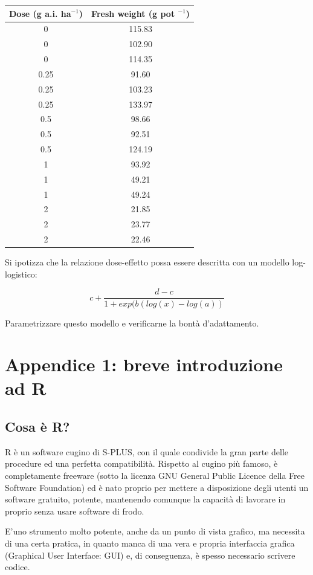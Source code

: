 \documentclass[a4paper,12pt,oneside]{book}
\begin{document}
\begin{longtable}[]{@{}cc@{}}
\toprule
Dose (g a.i. ha\(^{-1}\)) & Fresh weight (g pot \(^{-1}\)) \\
\midrule
\endhead
0 & 115.83 \\
0 & 102.90 \\
0 & 114.35 \\
0.25 & 91.60 \\
0.25 & 103.23 \\
0.25 & 133.97 \\
0.5 & 98.66 \\
0.5 & 92.51 \\
0.5 & 124.19 \\
1 & 93.92 \\
1 & 49.21 \\
1 & 49.24 \\
2 & 21.85 \\
2 & 23.77 \\
2 & 22.46 \\
\bottomrule
\end{longtable}

Si ipotizza che la relazione dose-effetto possa essere descritta con un modello log-logistico:

\[c + \frac{d - c}{1 + exp(b ( log (x) - log (a))}\]

Parametrizzare questo modello e verificarne la bontà d'adattamento.

\hypertarget{appendice-1-breve-introduzione-ad-r}{%
\chapter{Appendice 1: breve introduzione ad R}\label{appendice-1-breve-introduzione-ad-r}}

\hypertarget{cosa-uxe8-r}{%
\section*{Cosa è R?}\label{cosa-uxe8-r}}

R è un software cugino di S-PLUS, con il quale condivide la gran parte delle procedure ed una perfetta compatibilità. Rispetto al cugino più famoso, è completamente freeware (sotto la licenza GNU General Public Licence della Free Software Foundation) ed è nato proprio per mettere a disposizione degli utenti un software gratuito, potente, mantenendo comunque la capacità di lavorare in proprio senza usare software di frodo.

E'uno strumento molto potente, anche da un punto di vista grafico, ma necessita di una certa pratica, in quanto manca di una vera e propria interfaccia grafica (Graphical User Interface: GUI) e, di conseguenza, è spesso necessario scrivere codice.
\end{document}
